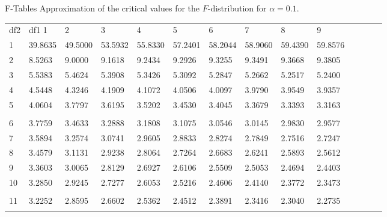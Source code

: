 \begin{frame}{F-Tables}
{\small Approximation of the critical values for the $F$-distribution for $\alpha=0.1$. }
 {
   \fontsize{5pt}{5pt}
   \selectfont
   \begin{tabular}{l|lllllllllllll} 
     df2  & df1      1  &      2  &      3  &      4  &      5  &      6  &      7  &      8  &      9   \\ 
     1 & 39.8635 & 49.5000 & 53.5932 & 55.8330 & 57.2401 & 58.2044 & 58.9060 & 59.4390 & 59.8576   \\[5pt] \arrayrulecolor{light-gray}\hline\arrayrulecolor{black}  
     2 & 8.5263 & 9.0000 & 9.1618 & 9.2434 & 9.2926 & 9.3255 & 9.3491 & 9.3668 & 9.3805  \\[5pt] \arrayrulecolor{light-gray}\hline\arrayrulecolor{black}  
     3 & 5.5383 & 5.4624 & 5.3908 & 5.3426 & 5.3092 & 5.2847 & 5.2662 & 5.2517 & 5.2400  \\[5pt] \arrayrulecolor{light-gray}\hline\arrayrulecolor{black}  
     4 & 4.5448 & 4.3246 & 4.1909 & 4.1072 & 4.0506 & 4.0097 & 3.9790 & 3.9549 & 3.9357  \\[5pt] \arrayrulecolor{light-gray}\hline\arrayrulecolor{black}  
     5 & 4.0604 & 3.7797 & 3.6195 & 3.5202 & 3.4530 & 3.4045 & 3.3679 & 3.3393 & 3.3163  \\[5pt] \arrayrulecolor{light-gray}\hline\arrayrulecolor{black}  
     \\ 
     6 & 3.7759 & 3.4633 & 3.2888 & 3.1808 & 3.1075 & 3.0546 & 3.0145 & 2.9830 & 2.9577  \\[5pt] \arrayrulecolor{light-gray}\hline\arrayrulecolor{black}  
     7 & 3.5894 & 3.2574 & 3.0741 & 2.9605 & 2.8833 & 2.8274 & 2.7849 & 2.7516 & 2.7247  \\[5pt] \arrayrulecolor{light-gray}\hline\arrayrulecolor{black}  
     8 & 3.4579 & 3.1131 & 2.9238 & 2.8064 & 2.7264 & 2.6683 & 2.6241 & 2.5893 & 2.5612  \\[5pt] \arrayrulecolor{light-gray}\hline\arrayrulecolor{black}  
     9 & 3.3603 & 3.0065 & 2.8129 & 2.6927 & 2.6106 & 2.5509 & 2.5053 & 2.4694 & 2.4403  \\[5pt] \arrayrulecolor{light-gray}\hline\arrayrulecolor{black}  
     10 & 3.2850 & 2.9245 & 2.7277 & 2.6053 & 2.5216 & 2.4606 & 2.4140 & 2.3772 & 2.3473  \\[5pt] \arrayrulecolor{light-gray}\hline\arrayrulecolor{black}  
     \\ 
     11 & 3.2252 & 2.8595 & 2.6602 & 2.5362 & 2.4512 & 2.3891 & 2.3416 & 2.3040 & 2.2735  \\[5pt] \arrayrulecolor{light-gray}\hline\arrayrulecolor{black}  

\end{tabular}}
\end{frame}
